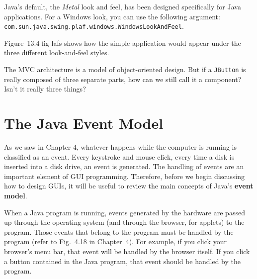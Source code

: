 Java's default, the {\it Metal} look and feel, has been designed
specifically for Java applications.  For a Windows look, you can use
the following argument:
\verb|com.sun.java.swing.plaf.windows.WindowsLookAndFeel|.\break

\noindent Figure~13.4
 {fig-lafs}
shows how the simple application would appear under the
three different look-and-feel styles.



\begin{SSTUDY}

\item  The MVC architecture is a model of object-oriented design.  But if a
{\tt JButton} is really composed of three separate parts, how can we
still call it a component? Isn't it really three things?

\end{SSTUDY}

\section{The Java Event Model}

\noindent As we saw in Chapter 4, whatever happens while the computer
is running is classified as an event.  Every keystroke and mouse
click, every time a disk is inserted into a disk drive, an event is
generated.  The handling of events are an important element of GUI
programming. Therefore, before we begin discussing how to design GUIs,
it will be useful to review the main concepts of Java's {\bf event
model}.

When a Java program is running, events generated by the hardware are
passed up through the operating system (and through the browser, for
applets) to the program.  Those events that belong to the program must
be handled by the program (refer to Fig.~4.18 in
Chapter~4). For example, if you click your browser's menu bar, that
event will be handled by the browser itself.  If you click a button
contained in the Java program, that event should be handled by the
program.

